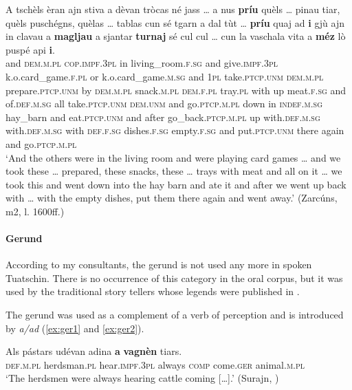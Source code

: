 \ea\label{ex:omit:1}
\gll    A tschèls èran ajn stiva a dèvan tròcas né jass … a nus \textbf{príu} quèls … pinau tiar, quèls puschégns, quèlas … tablas cun sé tgarn a dal tùt … \textbf{príu} quaj ad \textbf{i} gjù ajn in clavau a \textbf{magljau} a sjantar \textbf{turnaj} sé cul cul … cun la vaschala vita a \textbf{méz} lò puspé api \textbf{i}.\\
and \textsc{dem.m.pl} \textsc{cop.impf.3pl} in living\_room.\textsc{f.sg} and give.\textsc{impf.3pl} k.o.card\_game.\textsc{f.pl} or k.o.card\_game.\textsc{m.sg} {} and \textsc{1pl} take.\textsc{ptcp.unm} \textsc{dem.m.pl} {} prepare.\textsc{ptcp.unm} by \textsc{dem.m.pl} snack.\textsc{m.pl}  \textsc{dem.f.pl} {} tray.\textsc{pl} with up meat.\textsc{f.sg} and of.\textsc{def.m.sg} all {} take.\textsc{ptcp.unm} \textsc{dem.unm} and go.\textsc{ptcp.m.pl} down in \textsc{indef.m.sg} hay\_barn and eat.\textsc{ptcp.unm} and after go\_back.\textsc{ptcp.m.pl} up with.\textsc{def.m.sg} with.\textsc{def.m.sg} {} with \textsc{def.f.sg} dishes.\textsc{f.sg} empty.\textsc{f.sg} and put.\textsc{ptcp.unm} there again and go.\textsc{ptcp.m.pl}\\
\glt `And the others were in the living room and were playing card games … and we took these … prepared, these snacks, these … trays with meat and all on it … we took this and went down into the hay barn and ate it and after we went up back with … with the empty dishes, put them there again and went away.' (Zarcúns, m2, l. 1600ff.)
\z

\paragraph{Gerund}

According to my consultants, the gerund is not used any more in spoken Tuatschin. There is no occurrence of this category in the oral corpus, but it was used by the traditional story tellers whose legends were published in \citet{Büchli1966}.

The gerund was used as a complement of a verb of perception and is introduced by \textit{a/ad} (\ref{ex:ger1} and \ref{ex:ger2}).

\ea\label{ex:ger1}
\gll    Als pástars udévan adina \textbf{a} \textbf{vagnèn} tiars.\\
   \textsc{def.m.pl} herdsman.\textsc{pl} hear.\textsc{impf.3pl} always \textsc{comp} come.\textsc{ger}  animal.\textsc{m.pl}\\
\glt `The herdsmen were always hearing cattle coming […].' (Surajn, \citealt[53]{Büchli1966})
\z


